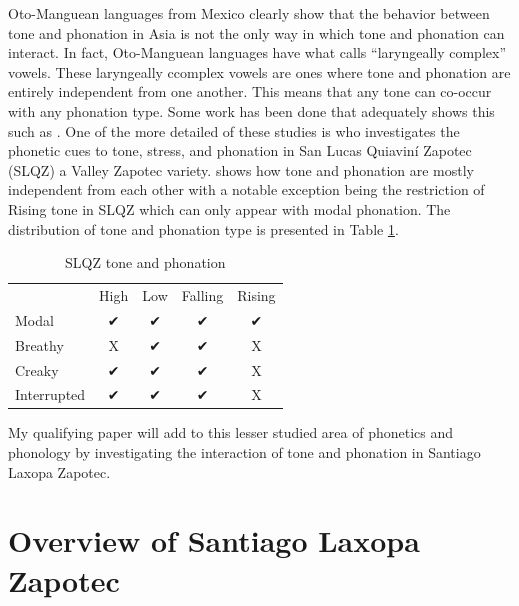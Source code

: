 \documentclass[12pt, letterpaper]{article}
\providecommand{\lsptoprule}{\midrule\toprule}
\providecommand{\lspbottomrule}{\bottomrule\midrule}
\begin{document}
Oto-Manguean languages from Mexico clearly show that the behavior between tone and phonation in Asia is not the only way in which tone and phonation can interact. In fact, Oto-Manguean languages have what \citet{silvermanLaryngealComplexityOtomanguean1997} calls ``laryngeally complex'' vowels. These laryngeally ccomplex vowels are ones where tone and phonation are entirely independent from one another. This means that any tone can co-occur with any phonation type. Some work has been done that adequately shows this such as \citet{avelinobecerraTopicsYalalagZapotec2004,chavez-peonInteractionMetricalStructure2010,dicanioCoarticulationToneGlottal2012,uchiharaToneRegistrogenesisQuiavini2016}. One of the more detailed of these studies is \citet{chavez-peonInteractionMetricalStructure2010} who investigates the phonetic cues to tone, stress, and phonation in San Lucas Quiaviní Zapotec (SLQZ) a Valley Zapotec variety. \citeauthor{chavez-peonInteractionMetricalStructure2010} shows how tone and phonation are mostly independent from each other with a notable exception being the restriction of Rising tone in SLQZ which can only appear with modal phonation. The distribution of tone and phonation type is presented in Table \ref{tab:slqz}.

\begin{table}[!ht]
\centering
\caption{SLQZ tone and phonation}
\label{tab:slqz}
 \begin{tabular}{lcccc}
  \lsptoprule
  				&	 High  & Low & Falling & Rising \\
  	Modal	& ✔︎ & ✔︎ & ✔︎ & ✔︎ \\
  	Breathy & X & ✔︎ & ✔︎ & X \\
  	Creaky & ✔︎ & ✔︎ & ✔︎ & X \\
  	Interrupted & ✔︎ & ✔︎ & ✔︎ & X \\
  \lspbottomrule
 \end{tabular}
\end{table}

My qualifying paper will add to this lesser studied area of phonetics and phonology by investigating the interaction of tone and phonation in Santiago Laxopa Zapotec.

\section{Overview of Santiago Laxopa Zapotec} \label{sec:SLZ}
\end{document}
